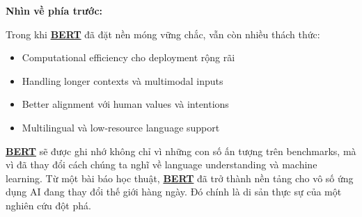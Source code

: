 \textbf{Nhìn về phía trước:}

Trong khi \hyperref[acro:bert]{\textbf{BERT}} đã đặt nền móng vững chắc, vẫn còn nhiều thách thức:
\begin{itemize}
    \item Computational efficiency cho deployment rộng rãi
    \item Handling longer contexts và multimodal inputs
    \item Better alignment với human values và intentions
    \item Multilingual và low-resource language support
\end{itemize}

\hyperref[acro:bert]{\textbf{BERT}} sẽ được ghi nhớ không chỉ
vì những con số ấn tượng trên benchmarks, mà vì đã thay đổi cách chúng ta nghĩ về language understanding và machine learning.
Từ một bài báo học thuật, \hyperref[acro:bert]{\textbf{BERT}} đã trở thành nền tảng cho vô số ứng dụng AI đang thay đổi thế giới hàng ngày.
Đó chính là di sản thực sự của một nghiên cứu đột phá.